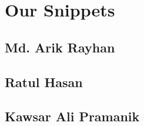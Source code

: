 \chapter{Our Snippets}

\section{Md. Arik Rayhan}

\section{Ratul Hasan}

\section{Kawsar Ali Pramanik}
